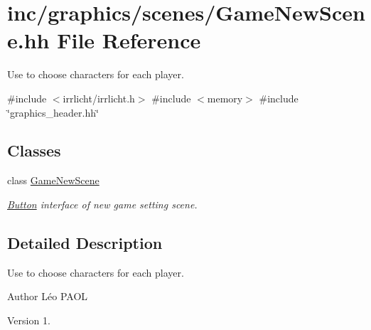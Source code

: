 \hypertarget{GameNewScene_8hh}{}\section{inc/graphics/scenes/\+Game\+New\+Scene.hh File Reference}
\label{GameNewScene_8hh}


Use to choose characters for each player.  


{\ttfamily \#include $<$irrlicht/irrlicht.\+h$>$}\newline
{\ttfamily \#include $<$memory$>$}\newline
{\ttfamily \#include \char`\"{}graphics\+\_\+header.\+hh\char`\"{}}\newline
\subsection*{Classes}
\begin{DoxyCompactItemize}
\item 
class \hyperlink{classGameNewScene}{Game\+New\+Scene}
\begin{DoxyCompactList}\small\item\em \hyperlink{classButton}{Button} interface of new game setting scene. \end{DoxyCompactList}\end{DoxyCompactItemize}


\subsection{Detailed Description}
Use to choose characters for each player. 

\begin{DoxyAuthor}{Author}
Léo P\+A\+OL 
\end{DoxyAuthor}
\begin{DoxyVersion}{Version}
1. 
\end{DoxyVersion}
